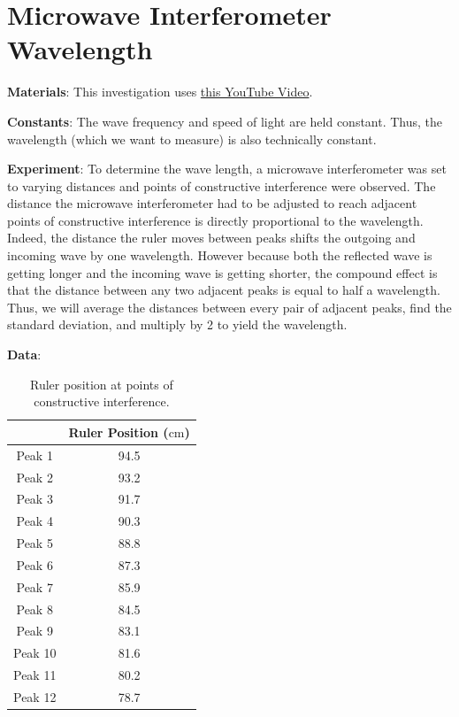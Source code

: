 \documentclass{article}
\begin{document}
\section{Microwave Interferometer Wavelength}
\textbf{Materials}: This investigation uses \href{https://youtu.be/OxkM7_dpSpk}{this YouTube Video}.\par
\textbf{Constants}: The wave frequency and speed of light are held constant. Thus, the wavelength (which we want to measure) is also technically constant.\par
\textbf{Experiment}: To determine the wave length, a microwave interferometer was set to varying distances and points of constructive interference were observed. The distance the microwave interferometer had to be adjusted to reach adjacent points of constructive interference is directly proportional to the wavelength. Indeed, the distance the ruler moves between peaks shifts the outgoing and incoming wave by one wavelength. However because both the reflected wave is getting longer and the incoming wave is getting shorter, the compound effect is that the distance between any two adjacent peaks is equal to half a wavelength. Thus, we will average the distances between every pair of adjacent peaks, find the standard deviation, and multiply by 2 to yield the wavelength.\par
\textbf{Data}:
\begin{table}[h!]
    \centering
    \renewcommand{\arraystretch}{1.4}
    \begin{tabular}{c|c}
                & Ruler Position ($\si{\centi\meter}$)\\
        \hline
        Peak 1 & 94.5\\
        Peak 2 & 93.2\\
        Peak 3 & 91.7\\
        Peak 4 & 90.3\\
        Peak 5 & 88.8\\
        Peak 6 & 87.3\\
        Peak 7 & 85.9\\
        Peak 8 & 84.5\\
        Peak 9 & 83.1\\
        Peak 10 & 81.6\\
        Peak 11 & 80.2\\
        Peak 12 & 78.7\\
    \end{tabular}
    \caption{Ruler position at points of constructive interference.}
    \label{fig:exp1data}
\end{table}\par
\end{document}
